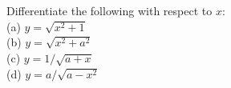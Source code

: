 Differentiate the following with respect to $x$:\\
(a) $y=\sqrt{x^2+1}$ \\
(b) $y=\sqrt{x^2+a^2}$ \\
(c) $y=1/\sqrt{a+x}$ \\
(d) $y=a/\sqrt{a-x^2}$ \\
 \thompson
